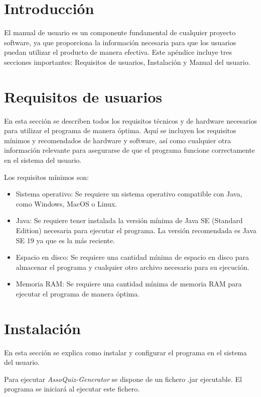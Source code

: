 
\section{Introducción}

El manual de usuario es un componente fundamental de cualquier proyecto software, ya que proporciona la información necesaria para que los usuarios puedan utilizar el producto de manera efectiva. Este apéndice incluye tres secciones importantes: Requisitos de usuarios, Instalación y Manual del usuario.

\section{Requisitos de usuarios}

En esta sección se describen todos los requisitos técnicos y de hardware necesarios para utilizar el programa de manera óptima. Aquí se incluyen los requisitos mínimos y recomendados de hardware y software, así como cualquier otra información relevante para asegurarse de que el programa funcione correctamente en el sistema del usuario.

Los requisitos mínimos son:
\begin{itemize}
    \item Sistema operativo: Se requiere un sistema operativo compatible con Java, como Windows, MacOS o Linux.
    \item Java: Se requiere tener instalada la versión mínima de Java SE (Standard Edition) necesaria para ejecutar el programa. La versión recomendada es Java SE 19 ya que es la más reciente.
    \item Espacio en disco: Se requiere una cantidad mínima de espacio en disco para almacenar el programa y cualquier otro archivo necesario para su ejecución.
    \item Memoria RAM: Se requiere una cantidad mínima de memoria RAM para ejecutar el programa de manera óptima.
\end{itemize}

\section{Instalación}

En esta sección se explica como instalar y configurar el programa en el sistema del usuario. 

Para ejecutar \textit{AssoQuiz-Generator} se dispone de un fichero .jar ejecutable. El programa se iniciará al ejecutar este fichero.

